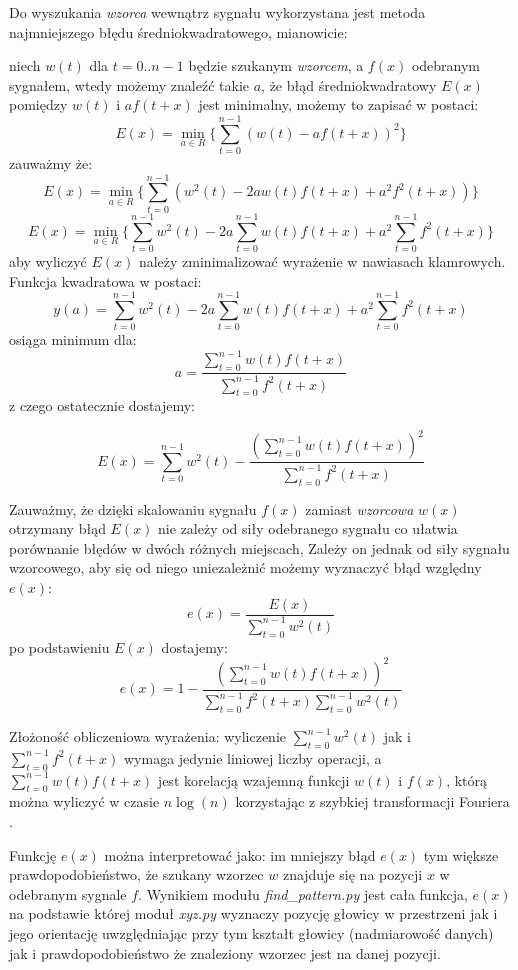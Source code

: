 Do wyszukania \textit{wzorca} wewnątrz sygnału wykorzystana jest metoda najmniejszego błędu średniokwadratowego, mianowicie:

niech $w(t)$  dla $t = 0..n-1$ będzie szukanym \textit{wzorcem}, a $f(x)$ odebranym sygnałem,
wtedy możemy znaleźć takie $a$, że błąd średniokwadratowy $E(x)$ pomiędzy $w(t)$ i $a f(t+x)$ jest minimalny,
możemy to zapisać w postaci:
\[
  E(x) = \min_{a \in R} \{ \sum_{t=0}^{n-1}  (w(t) - a f(t+x))^2 \}
\]
zauważmy że:
\[
  E(x) = \min_{a \in R} \{ \sum_{t=0}^{n-1}  (w^2(t) -2a w(t) f(t+x) + a^2 f^2(t+x)) \}
\]
\[
  E(x) = \min_{a \in R} \{ \sum_{t=0}^{n-1}  w^2(t) -2a \sum_{t=0}^{n-1}  w(t) f(t+x) + a^2 \sum_{t=0}^{n-1} f^2(t+x) \}
\]
aby wyliczyć $E(x)$ należy zminimalizować wyrażenie w nawiasach klamrowych. Funkcja kwadratowa w postaci:
\[
  y(a) = \sum_{t=0}^{n-1}  w^2(t) -2a \sum_{t=0}^{n-1}  w(t) f(t+x) + a^2 \sum_{t=0}^{n-1} f^2(t+x)
\]
osiąga minimum dla:
\[
 a = \frac{ \sum\limits_{t=0}^{n-1}  w(t) f(t+x) }{ \sum\limits_{t=0}^{n-1} f^2(t+x) }
\]
z czego ostatecznie dostajemy:

\[
  E(x) = \sum_{t=0}^{n-1}  w^2(t)  - \frac {(\sum\limits_{t=0}^{n-1}  w(t) f(t+x) )^2 } { \sum\limits_{t=0}^{n-1} f^2(t+x)}
\]

Zauważmy, że dzięki skalowaniu sygnału $f(x)$ zamiast \textit{wzorcowa} $w(x)$
otrzymany błąd $E(x)$ nie zależy od siły odebranego sygnału co ułatwia porównanie błędów w dwóch różnych miejscach,
Zależy on jednak od siły sygnału wzorcowego, aby się od niego uniezależnić możemy wyznaczyć
błąd względny $e(x)$:
\[
  e(x) = \frac{E(x)}{\sum\limits_{t=0}^{n-1}  w^2(t)}
\]
po podstawieniu $E(x)$ dostajemy:
\[
  e(x) = 1 - \frac {(\sum\limits_{t=0}^{n-1}  w(t) f(t+x) )^2 } { \sum\limits_{t=0}^{n-1} f^2(t+x) \sum\limits_{t=0}^{n-1}  w^2(t)}
\]

Złożoność obliczeniowa wyrażenia: wyliczenie $ \sum\limits_{t=0}^{n-1}  w^2(t) $ 
jak i $\sum\limits_{t=0}^{n-1} f^2(t+x)$ wymaga jedynie liniowej liczby operacji, a 
 $\sum\limits_{t=0}^{n-1}  w(t) f(t+x) $ jest korelacją wzajemną funkcji $w(t)$ i $f(x)$, którą
 można wyliczyć w czasie $n \log(n)$ korzystając z szybkiej transformacji Fouriera \cite{bib:FFT_correlation}.
 
 Funkcję $e(x)$  można interpretować jako:
 im mniejszy błąd $e(x)$ tym większe prawdopodobieństwo, że szukany wzorzec $w$ znajduje się na pozycji $x$ w 
 odebranym sygnale $f$. 
 Wynikiem modułu \textit{find\_pattern.py} jest cała funkcja, $e(x)$ na podstawie której moduł \textit{xyz.py}
 wyznaczy pozycję głowicy w przestrzeni jak i jego orientację uwzględniając przy tym 
 kształt głowicy (nadmiarowość danych) jak i prawdopodobieństwo że znaleziony wzorzec jest na danej pozycji.
 
